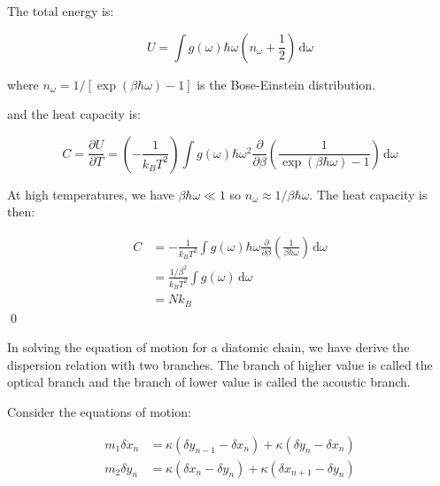 \documentclass[12pt]{article}
\begin{document}
The total energy is:

\begin{equation}
    U = \int g(\omega) \hbar \omega \left( n_{\omega} + \frac{1}{2} \right) \, \mathrm{d}\omega
\end{equation}

where $n_{\omega} = 1/[\exp(\beta \hbar \omega) - 1]$ is the Bose-Einstein distribution.

and the heat capacity is:

\begin{equation}
    C = \frac{\partial U}{\partial T} = \left( -\frac{1}{k_{B}T^{2}} \right) \int g(\omega) \hbar \omega^{2} \frac{\partial }{\partial \beta} \left( \frac{1}{\exp(\beta \hbar \omega) - 1} \right) \, \mathrm{d}\omega
\end{equation}

At high temperatures, we have $\beta \hbar \omega \ll 1$ so $n_{\omega} \approx 1/\beta \hbar \omega$. The heat capacity is then:

\begin{equation}
    \begin{split}
        C &= -\frac{1}{k_{B}T^{2}} \int g(\omega) \hbar \omega \frac{\partial }{\partial \beta} \left( \frac{1}{\beta \hbar \omega} \right) \, \mathrm{d}\omega \\
        &= \frac{1/\beta^{2}}{k_{B}T^{2}} \int g(\omega) \, \mathrm{d}\omega \\
        &= Nk_{B}
    \end{split}
\end{equation}
\qed



In solving the equation of motion for a diatomic chain, we have derive the dispersion relation with two branches. The branch of higher value is called the optical branch and the branch of lower value is called the acoustic branch.

Consider the equations of motion:

\begin{equation}
    \begin{split}
        m_{1} \delta \ddot{x}_{n} &= \kappa (\delta y_{n - 1} - \delta x_{n}) + \kappa (\delta y_{n} - \delta x_{n}) \\
        m_{2} \delta \ddot{y}_{n} &= \kappa (\delta x_{n} - \delta y_{n}) + \kappa (\delta x_{n + 1} - \delta y_{n})
    \end{split}
\end{equation}
\end{document}
